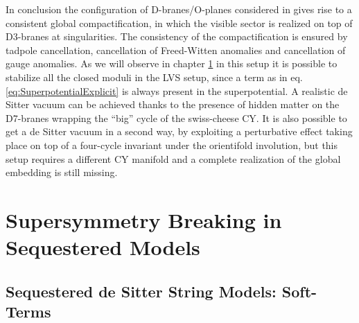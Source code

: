 \documentclass[12pt,a4paper]{book}
\begin{document}
In conclusion the configuration of D-branes/O-planes considered in \cite{Cicoli:2012vw} gives rise to a consistent global compactification, in which the visible sector is realized on top of D3-branes at singularities. The consistency of the compactification is ensured by tadpole cancellation, cancellation of Freed-Witten anomalies and cancellation of gauge anomalies. As we will observe in chapter \ref{chap:Soft-Terms} in this setup it is possible to stabilize all the closed moduli in the LVS setup, since a term as in eq. \eqref{eq:SuperpotentialExplicit} is always present in the superpotential. A realistic de Sitter vacuum can be achieved thanks to the presence of hidden matter on the D7-branes wrapping the ``big'' cycle of the swiss-cheese CY. It is also possible to get a de Sitter vacuum in a second way, by exploiting a perturbative effect taking place on top of a four-cycle invariant under the orientifold involution, but this setup requires a different CY manifold and a complete realization of the global embedding is still missing.

\part{Supersymmetry Breaking in Sequestered Models}
\label{part:SUSYBreaking}

\chapter{Sequestered de Sitter String Models: Soft-Terms}
\label{chap:Soft-Terms}
\end{document}
